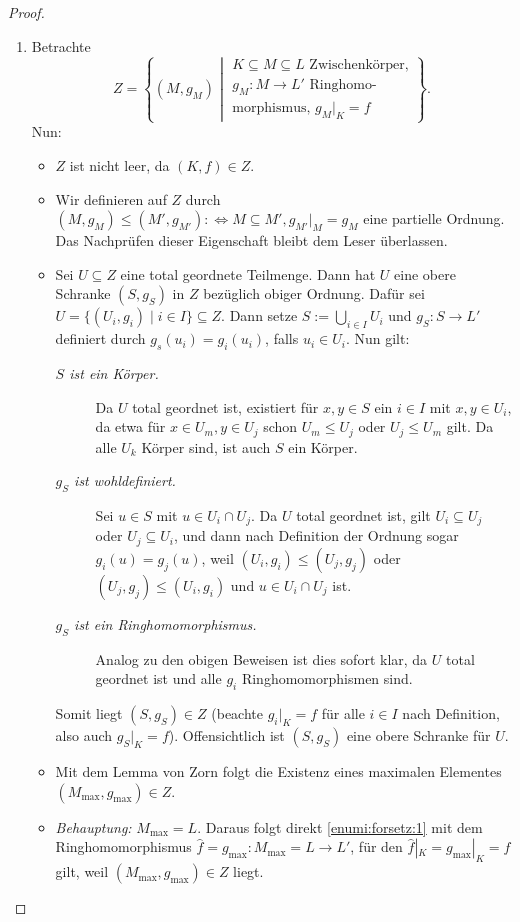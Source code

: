 \documentclass[12pt,a4paper]{scrartcl}
\begin{document}
\begin{proof}
	\leavevmode
	\begin{enumerate}
		\item Betrachte
		\[Z =\left\{(M, g_M) \middle| \substack{\text{$K\subseteq M\subseteq L$ Zwischenkörper,}\\\text{$g_M\colon M\to L'$ Ringhomo-}\\\text{morphismus, $g_M|_K = f$}}\right\}.\]
		Nun: \begin{itemize}
			\item $Z$ ist nicht leer, da $(K,f)\in Z$.
			\item Wir definieren auf $Z$ durch $(M, g_M)\leq (M',g_{M'}):\Leftrightarrow M\subseteq M', g_{M'}|_M = g_M$ eine partielle Ordnung. Das Nachprüfen dieser Eigenschaft bleibt dem Leser überlassen.
			\item Sei $U\subseteq Z$ eine total geordnete Teilmenge. Dann hat $U$ eine obere Schranke $(S, g_S)$ in $Z$ bezüglich obiger Ordnung. Dafür sei $U  = \{(U_i,g_i)\mid i\in I\}\subseteq Z$. Dann setze $S := \bigcup_{i\in I} U_i$ und $g_S\colon S\to L'$ definiert durch $g_s(u_i) = g_i(u_i)$, falls $u_i\in U_i$. Nun gilt:
			\begin{description}
				\item[\emph{$S$ ist ein Körper.}] Da $U$ total geordnet ist, existiert für $x,y\in S$ ein $i\in I$ mit $x,y\in U_i$, da etwa für $x\in U_m, y\in U_j$ schon $U_m\leq U_j$ oder $U_j\leq U_m$ gilt. Da alle $U_k$ Körper sind, ist auch $S$ ein Körper.
				\item[\emph{$g_S$ ist wohldefiniert.}] Sei $u\in S$ mit $u\in U_i\cap U_j$. Da $U$ total geordnet ist, gilt $U_i\subseteq U_j$ oder $U_j\subseteq U_i$, und dann nach Definition der Ordnung sogar $g_i(u) = g_j(u)$, weil $(U_i,g_i)\leq (U_j, g_j)$ oder $(U_j,g_j)\leq (U_i,g_i)$ und $u\in U_i\cap U_j$ ist.
				\item[\emph{$g_S$ ist ein Ringhomomorphismus.}] Analog zu den obigen Beweisen ist dies sofort klar, da $U$ total geordnet ist und alle $g_i$ Ringhomomorphismen sind.
			\end{description}
			Somit liegt $(S, g_S)\in Z$ (beachte $g_i|_K = f$ für alle $i\in I$ nach Definition, also auch $g_S|_K = f$). Offensichtlich ist $(S,g_S)$ eine obere Schranke für $U$.
			\item Mit dem Lemma von Zorn folgt die Existenz eines maximalen Elementes $(M_{\max}, g_{\max})\in Z$.
			\item \emph{Behauptung:} $M_{\max} = L$. Daraus folgt direkt \ref{enumi:forsetz:1} mit dem Ringhomomorphismus $\hat{f} = g_{\max}\colon M_{\max} = L\to L'$, für den $\hat{f}|_K = g_{\max}|_K = f$ gilt, weil $(M_{\max}, g_{\max})\in Z$ liegt.

\end{itemize}
\end{enumerate}
\end{proof}
\end{document}
